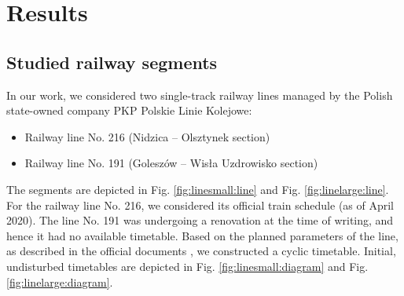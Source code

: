 \section{Results}

\subsection{Studied railway segments}
In our work, we considered two single-track railway lines managed by the Polish
state-owned company PKP Polskie Linie Kolejowe:

\begin{itemize}
  \item Railway line No. 216 (Nidzica -- Olsztynek section)
  \item Railway line No. 191 (Goleszów -- Wisła Uzdrowisko section)
\end{itemize}

The segments are depicted in Fig. \ref{fig:linesmall:line} and Fig.
\ref{fig:linelarge:line}. For the railway line No. 216, we considered its
official train schedule (as of April 2020). The line No. 191 was undergoing a
renovation at the time of writing, and hence it had no available timetable.
Based on the planned parameters of the line, as described in the official
documents \cite{PKPPLK}, we constructed a cyclic timetable. Initial,
undisturbed timetables are depicted in Fig. \ref{fig:linesmall:diagram} and
Fig. \ref{fig:linelarge:diagram}.

